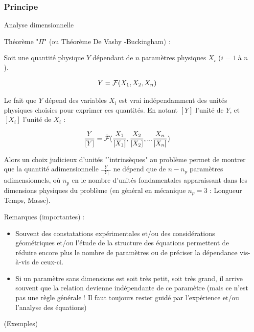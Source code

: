 \subsubsection{Principe}
\begin{frame}{Analyse dimensionnelle}

\small


Théorème "$\Pi$" (ou Théorème De Vashy -Buckingham) :

\pause 
\medskip

Soit une quantité physique $Y$ dépendant de $n$ paramètres physiques $X_i$ ($i=1$ à $n$).

$$
{Y} = {\cal F }(X_1, X_2, X_n)
$$
\pause

Le fait que $Y$ dépend des variables $X_i$ est vrai indépendamment des unités physiques choisies pour exprimer ces quantités. En notant $[Y]$ l'unité de $Y$, et $[X_i]$ l'unité de $X_i$ :

$$
\frac{Y}{[Y]} = \bar{\cal F }( \frac{X_1}{[X_1]}, \frac{X_2}{[X_2]}, ... \frac{X_n}{[X_n]})
$$
\pause

Alors un choix judicieux d'unités "'intrinsèques" au problème permet de montrer que la quantité adimensionnelle $\frac{Y}{[Y]}$ ne dépend que de $n-n_p$ paramètres adimensionnels, où $n_p$ en le nombre d'unités fondamentales apparaissant dans les dimensions physiques du problème (en général en mécanique $n_p = 3$ : Longueur Temps, Masse).

\pause 
\medskip


%


Remarques (importantes) : 
\begin{itemize}
\item Souvent des {\color{bleu} constatations expérimentales} et/ou des {\color{purple} considérations géométriques} et/ou l'étude de la {\color{red} structure des équations }  permettent de réduire encore plus le nombre de paramètres ou de préciser la dépendance vis-à-vis de ceux-ci. 

\item Si un paramètre sans dimensions est soit très petit, soit très grand, il arrive souvent que la relation devienne indépendante de ce paramètre
(mais ce n'est pas une règle générale ! Il faut toujours rester guidé par l'expérience et/ou l'analyse des équations)

\end{itemize}

{\color{green}(Exemples)} 


\vspace{0mm}

\end{frame}

